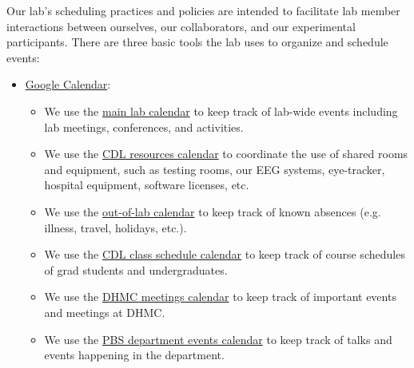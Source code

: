 \documentclass{tufte-book} %
\begin{document}
\noindent {}  Our lab's scheduling practices and
policies are intended to facilitate lab member interactions between
ourselves, our collaborators, and our experimental participants.
There are three basic tools the lab uses to organize and schedule
events:
\begin{itemize}
\item \href{http://calendar.google.com}{Google Calendar}:
  \begin{itemize}
  \item We use the
    \href{https://calendar.google.com/calendar/ical/5ta50cfv4uih0a0k8m2di9dhjo\%40group.calendar.google.com/private-ff1338ddce84ac37d5ab682cd94e7f69/basic.ics}{main
      lab calendar} to keep track of lab-wide events including lab
    meetings, conferences, and activities.
      \item We use the
  \href{https://calendar.google.com/calendar/ical/dgcv8l8a8s10hfg2s5h0qec0q0\%40group.calendar.google.com/private-4810aed94f818d5748045447ab46c62d/basic.ics}{CDL
    resources calendar} to coordinate the use of shared rooms and
  equipment, such as testing rooms, our EEG systems, eye-tracker, hospital
  equipment, software licenses, etc.
  \item We use the \href{https://calendar.google.com/calendar/ical/h1j06dohcg7v1g2o5tkb7ijhvs\%40group.calendar.google.com/private-239aaf8b4dc60480c90e8d7fc353e229/basic.ics}{out-of-lab calendar} to keep track of known
  absences (e.g. illness, travel, holidays, etc.).
\item We use the
  \href{https://calendar.google.com/calendar/ical/v2selomg4o6aobua7g922aamqc\%40group.calendar.google.com/private-4377dd542d0d1f6226c9657955b778c5/basic.ics}{CDL
  class schedule calendar} to keep track of course
schedules of grad students and undergraduates.
  \item We use the \href{https://calendar.google.com/calendar/ical/j6noo2tqahpsoq9na1h16paf3s\%40group.calendar.google.com/private-c3d75bea1ab4605947353d159d3dcd05/basic.ics}{DHMC meetings
  calendar} to keep track of important events and meetings at DHMC.
  \item We use the \href{https://calendar.google.com/calendar/ical/mp1bujb39ud5bgmmnq9r8dbiuk\%40group.calendar.google.com/private-8a3c6919c30e7b118ab3a4fd23aad6cf/basic.ics}{PBS department events calendar} to keep track of talks and events happening in the department.

\end{itemize}
\end{itemize}
\end{document}
